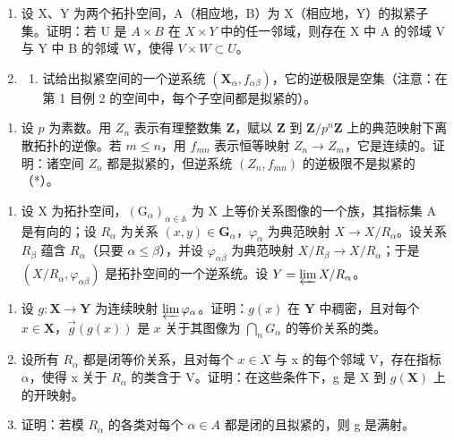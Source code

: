\begin{enumerate}
\def\labelenumi{\arabic{enumi})}
\setcounter{enumi}{5}
\item
  设 X、Y 为两个拓扑空间，A（相应地，B）为 X（相应地，Y）的拟紧子集。证明：若 U 是 \(A \times B\) 在 \(X \times Y\) 中的任一邻域，则存在 X 中 A 的邻域 V 与 Y 中 B 的邻域 W，使得 \(V \times W \subset U\)。
\item
  \begin{enumerate}
  \def\labelenumii{\alph{enumii})}
  \tightlist
  \item
    试给出拟紧空间的一个逆系统 \((\mathbf{X}_{\alpha}, f_{\alpha\beta})\)，它的逆极限是空集（注意：在第 1 目例 2 的空间中，每个子空间都是拟紧的）。
  \end{enumerate}
\end{enumerate}

\begin{enumerate}
\def\labelenumi{\alph{enumi})}
\setcounter{enumi}{1}
\tightlist
\item
  设 \(p\) 为素数。用 \(Z_{n}\) 表示有理整数集 \(\mathbf{Z}\)，赋以 \(\mathbf{Z}\) 到 \(\mathbf{Z} / p^{n}\mathbf{Z}\) 上的典范映射下离散拓扑的逆像。若 \(m \leqslant n\)，用 \(f_{mn}\) 表示恒等映射 \(Z_{n} \to Z_{m}\)，它是连续的。证明：诸空间 \(Z_{n}\) 都是拟紧的，但逆系统 \((Z_{n}, f_{mn})\) 的逆极限不是拟紧的（*）。
\end{enumerate}

\begin{enumerate}
\def\labelenumi{\arabic{enumi})}
\setcounter{enumi}{7}
\tightlist
\item
  设 X 为拓扑空间，\((\mathrm{G}_{\alpha})_{\alpha\in\mathbb{A}}\) 为 X 上等价关系图像的一个族，其指标集 A 是有向的；设 \(R_{\alpha}\) 为关系 \((x,y)\in\mathbf{G}_{\alpha}\)，\(\varphi_{\alpha}\) 为典范映射 \(X\to X/R_{\alpha}\)。设关系 \(R_{\beta}\) 蕴含 \(R_{\alpha}\)（只要 \(\alpha\leqslant\beta\)），并设 \(\varphi_{\alpha\beta}\) 为典范映射 \(X/R_{\beta}\to X/R_{\alpha}\)；于是 \((X/R_{\alpha},\varphi_{\alpha\beta})\) 是拓扑空间的一个逆系统。设 \(Y=\varprojlim X/R_{\alpha}\)。
\end{enumerate}

\begin{enumerate}
\def\labelenumi{\alph{enumi})}
\item
  设 \(g: \mathbf{X} \to \mathbf{Y}\) 为连续映射 \(\varprojlim \varphi_{\alpha}\)。证明：\(g(x)\) 在 \(\mathbf{Y}\) 中稠密，且对每个 \(x \in \mathbf{X}\)，\(\overrightarrow{g}(g(x))\) 是 \(x\) 关于其图像为 \(\bigcap_{n} G_{\alpha}\) 的等价关系的类。
\item
  设所有 \(R_{\alpha}\) 都是闭等价关系，且对每个 \(x \in X\) 与 x 的每个邻域 V，存在指标 \(\alpha\)，使得 x 关于 \(R_{\alpha}\) 的类含于 V。证明：在这些条件下，g 是 X 到 \(g(\mathbf{X})\) 上的开映射。
\item
  证明：若模 \(R_{\alpha}\) 的各类对每个 \(\alpha \in A\) 都是闭的且拟紧的，则 g 是满射。
\end{enumerate}

